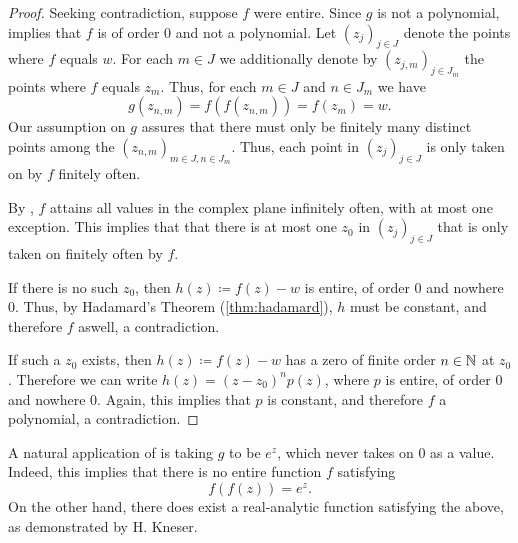 \begin{proof}
    Seeking contradiction, suppose $f$ were entire. Since $g$ is not a polynomial,  implies that $f$ is of order $0$ and not a polynomial. Let $(z_j)_{j \in J}$ denote the points where $f$ equals $w$. For each $m \in J$ we additionally denote by $(z_{j,m})_{j \in J_m}$ the points where $f$ equals $z_m$. Thus, for each $m \in J$ and $n \in J_m$ we have
    $$ g(z_{n,m}) = f(f(z_{n,m})) = f(z_m) = w. $$
    Our assumption on $g$ assures that there must only be finitely many distinct points among the $(z_{n,m})_{m \in J,n \in J_m}$. Thus, each point in $(z_j)_{j \in J}$ is only taken on by $f$ finitely often.

    By , $f$ attains all values in the complex plane infinitely often, with at most one exception. This implies that that there is at most one $z_0$ in $(z_j)_{j \in J}$ that is only taken on finitely often by $f$.

    If there is no such $z_0$, then $h(z) \coloneqq f(z) - w$ is entire, of order $0$ and nowhere $0$. Thus, by Hadamard's Theorem (\ref{thm:hadamard}), $h$ must be constant, and therefore $f$ aswell, a contradiction.

    If such a $z_0$ exists, then $h(z) \coloneqq f(z) - w$ has a zero of finite order $n \in \mathbb{N}$ at $z_0$. Therefore we can write $h(z) = (z - z_0)^n p(z)$, where $p$ is entire, of order $0$ and nowhere $0$. Again, this implies that $p$ is constant, and therefore $f$ a polynomial, a contradiction.
\end{proof}

\begin{example}
    A natural application of  is taking $g$ to be $e^z$, which never takes on $0$ as a value. Indeed, this implies that there is no entire function $f$ satisfying
    $$ f(f(z)) = e^z. $$
    On the other hand, there does exist a real-analytic function satisfying the above, as demonstrated by H. Kneser. 
\end{example}